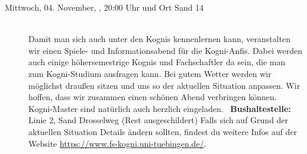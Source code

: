 \begin{description}
\ifkogwiss
    \item[Mittwoch, 04. November, \YEAR, 20:00 Uhr und Ort Sand 14]\ \\
         Damit man sich auch unter den Kognis kennenlernen kann, veranstalten wir einen Spiele- und Informationsabend für die Kogni-Anfis. Dabei werden auch einige höhersemestrige Kognis und Fachschaftler da sein, die man zum Kogni-Studium ausfragen kann. Bei gutem Wetter werden wir möglichst draußen sitzen und uns so der aktuellen Situation anpassen. Wir hoffen, dass wir zusammen einen schönen Abend verbringen können. Kogni-Master sind natürlich auch herzlich eingeladen.
	~\textbf{Bushaltestelle:} Linie 2, Sand Drosselweg (Rest ausgeschildert)
	Falls sich auf Grund der aktuellen Situation Details ändern sollten, findest du weitere Infos auf der Website \url{https://www.fs-kogni.uni-tuebingen.de/}.
\fi



\end{description}

